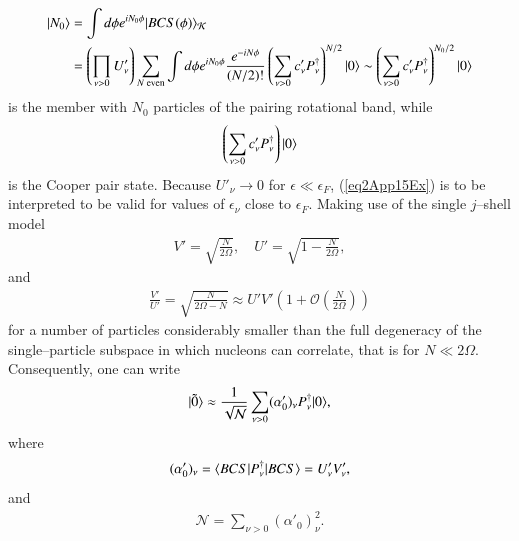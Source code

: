 \begin{subappendices}
\begin{align}
\nonumber|{N_0} \rangle&=\int d\phi e^{iN_0\phi}|{BCS(\phi)} \rangle_{\mathcal K}\\
&=\left(\prod_{\nu>0}U'_\nu\right)\sum_{N \text{ even}}\int d\phi e^{iN_0\phi}\frac{e^{-iN\phi}}{(N/2)!}\left(\sum_{\nu>0}c'_\nu P_\nu^\dagger\right)^{N/2}|{0} \rangle\sim\left(\sum_{\nu>0}c'_\nu P_\nu^\dagger\right)^{N_0/2}|{0} \rangle
\end{align}
is the member with $N_0$ particles of the pairing rotational band, while
\begin{align}\label{eq2App15Ex}
\left(\sum_{\nu>0}c'_\nu P_\nu^\dagger\right)|{0} \rangle
\end{align}
is the Cooper pair state. Because $U'_\nu\to 0$ for $\epsilon\ll \epsilon_F$, (\ref{eq2App15Ex}) is to be interpreted to be valid for values of $\epsilon_\nu$ close to $\epsilon_F$.
Making use of the single $j$--shell model
\begin{align}\label{eq2App16Ex}
V'=\sqrt{\frac{N}{2\Omega}},\quad U'=\sqrt{1-\frac{N}{2\Omega}},
\end{align}
and
\begin{align}\label{eq2App17Ex}
\frac{V'}{U'}=\sqrt{\frac{N}{2\Omega-N}}\approx U'V'\left(1+\mathcal O\left(\frac{N}{2\Omega}\right)\right)
\end{align}
for a number of particles considerably smaller than the full degeneracy of the single--particle subspace in which nucleons can correlate, that is for $N\ll2\Omega$. Consequently, one can write
\begin{align}\label{eq2App18Ex}
|{\tilde 0} \rangle\approx\frac{1}{\sqrt{\mathcal N}}\sum_{\nu>0}(\alpha'_0)_\nu P^\dagger_\nu|{0} \rangle,
\end{align}
where
\begin{align}\label{eq2App19Ex}
(\alpha'_0)_\nu =\langle {BCS|P^\dagger_\nu|BCS} \rangle=U'_\nu V'_\nu,
\end{align}
and
\begin{align}\label{eq2App20Ex}
\mathcal N=\sum_{\nu>0}(\alpha'_0)_\nu^2.
\end{align}











\end{subappendices}



\clearpage
\newpage















\renewcommand{\bibname}{Bibliography Ch 4}
 
%
%

